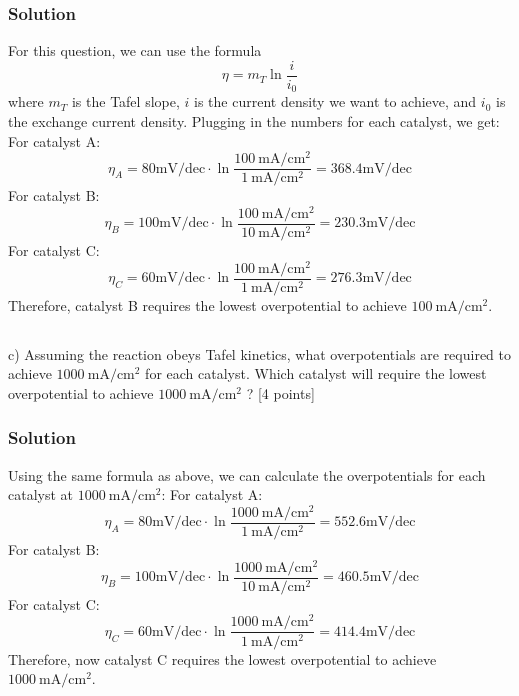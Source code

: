\documentclass[12pt]{article}
\begin{document}
\subsubsection{Solution}
For this question, we can use the formula
$$
\eta=m_T \ln \frac{i}{i_0}
$$
where $m_T$ is the Tafel slope, $i$ is the current density we want to achieve, and $i_0$ is the exchange current density. Plugging in the numbers for each catalyst, we get:
For catalyst A:
\begin{equation}
\eta_A=80 \mathrm{mV} / \mathrm{dec} \cdot \ln \frac{100 \mathrm{~mA} / \mathrm{cm}^{2}}{1 \mathrm{~mA} / \mathrm{cm}^{2}}=368.4 \mathrm{mV} / \mathrm{dec}
\end{equation}
For catalyst B:
\begin{equation}
\eta_B=100 \mathrm{mV} / \mathrm{dec} \cdot \ln \frac{100 \mathrm{~mA} / \mathrm{cm}^{2}}{10 \mathrm{~mA} / \mathrm{cm}^{2}}=230.3 \mathrm{mV} / \mathrm{dec}
\end{equation}
For catalyst C:
\begin{equation}
\eta_C=60 \mathrm{mV} / \mathrm{dec} \cdot \ln \frac{100 \mathrm{~mA} / \mathrm{cm}^{2}}{1 \mathrm{~mA} / \mathrm{cm}^{2}}=276.3 \mathrm{mV} / \mathrm{dec}
\end{equation}
Therefore, catalyst B requires the lowest overpotential to achieve $100 \mathrm{~mA} / \mathrm{cm}^{2}$.
\subsection{}
c) Assuming the reaction obeys Tafel kinetics, what overpotentials are required to achieve $1000 \mathrm{~mA} / \mathrm{cm}^{2}$ for each catalyst. Which catalyst will require the lowest overpotential to achieve $1000 \mathrm{~mA} / \mathrm{cm}^{2}$ ? [4 points]\\
\subsubsection{Solution}
Using the same formula as above, we can calculate the overpotentials for each catalyst at $1000 \mathrm{~mA} / \mathrm{cm}^{2}$:
For catalyst A:
\begin{equation}
\eta_A=80 \mathrm{mV} / \mathrm{dec} \cdot \ln \frac{1000 \mathrm{~mA} / \mathrm{cm}^{2}}{1 \mathrm{~mA} / \mathrm{cm}^{2}}=552.6 \mathrm{mV} / \mathrm{dec}
\end{equation}
For catalyst B:
\begin{equation}
\eta_B=100 \mathrm{mV} / \mathrm{dec} \cdot \ln \frac{1000 \mathrm{~mA} / \mathrm{cm}^{2}}{10 \mathrm{~mA} / \mathrm{cm}^{2}}=460.5 \mathrm{mV} / \mathrm{dec}
\end{equation}
For catalyst C:
\begin{equation}
\eta_C=60 \mathrm{mV} / \mathrm{dec} \cdot \ln \frac{1000 \mathrm{~mA} / \mathrm{cm}^{2}}{1 \mathrm{~mA} / \mathrm{cm}^{2}}=414.4 \mathrm{mV} / \mathrm{dec}
\end{equation}
Therefore, now catalyst C requires the lowest overpotential to achieve $1000 \mathrm{~mA} / \mathrm{cm}^{2}$.
\end{document}
